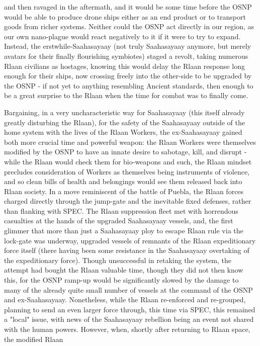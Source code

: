and then ravaged in the aftermath, and it would be some time before
the OSNP would be able to produce drone ships either as an end product
or to transport goods from richer systems. Neither could the OSNP act
directly in our region, as our own nano-plague would react negatively
to it if it were to try to expand. Instead, the erstwhile-Saahasayaay
(not truly Saahasayaay anymore, but merely avatars for their finally
flourishing symbiotes) staged a revolt, taking numerous Rlaan
civilians as hostages, knowing this would delay the Rlaan response
long enough for their ships, now crossing freely into the other-side
to be upgraded by the OSNP - if not yet to anything resembling Ancient
standards, then enough to be a great surprise to the Rlaan when the
time for combat was to finally come.

Bargaining, in a very uncharacteristic way for Saahasayaay (this
itself already greatly disturbing the Rlaan), for the safety of the
Saahasayaay outside of the home system with the lives of the Rlaan
Workers, the ex-Saahasayaay gained both more crucial time and powerful
weapon: the Rlaan Workers were themselves modified by the OSNP to have
an innate desire to sabotage, kill, and disrupt - while the Rlaan
would check them for bio-weapons and such, the Rlaan mindset precludes
consideration of Workers as themselves being instruments of violence,
and so clean bills of health and belongings would see them released
back into Rlaan society. In a move reminiscent of the battle of
Puebla, the Rlaan forces charged directly through the jump-gate and
the inevitable fixed defenses, rather than flanking with SPEC. The
Rlaan suppression fleet met with horrendous casualties at the hands of
the upgraded Saahasayaay vessels, and, the first glimmer that more
than just a Saahasayaay ploy to escape Rlaan rule via the lock-gate
was underway, upgraded vessels of remnants of the Rlaan expeditionary
force itself (there having been some resistance in the Saahasayaay
overtaking of the expeditionary force). Though unsuccessful in
retaking the system, the attempt had bought the Rlaan valuable time,
though they did not then know this, for the OSNP ramp-up would be
significantly slowed by the damage to many of the already quite small
number of vessels at the command of the OSNP and
ex-Saahasayaay. Nonetheless, while the Rlaan re-enforced and
re-grouped, planning to send an even larger force through, this time
via SPEC, this remained a "local" issue, with news of the Saahasayaay
rebellion being an event not shared with the human powers. However,
when, shortly after returning to Rlaan space, the modified Rlaan
